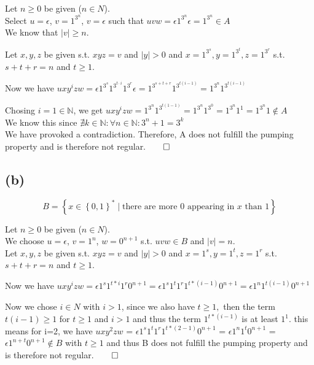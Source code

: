 Let $n \geq 0$ be given ($n \in N $).\\
Select $u = \epsilon$, $v=1^{3^{n}}$, $v=\epsilon$ such that $uvw = \epsilon 1^{3^{n}} \epsilon = 1^{3^{n}} \in A$\\
We know that $\lvert v \rvert \geq n$.

Let $x,y,z$ be given s.t. $xyz=v$ and $|y| > 0$ and $x=1^{3^{s}},y=1^{3^{t}},z=1^{3^{r}} $ s.t. $ s+t+r = n $ and $ t\geq 1$.

Now we have $uxy^izw = \epsilon 1^{3^{s}} 1^{3^{t\cdot i}} 1^{3^{r}} \epsilon = 1^{3^{s+t+r}} 1^{3^{t(i-1)}} = 1^{3^{n}}1^{3^{t(i-1)}}$

Chosing $i=1 \in \mathbb{N}$, we get $uxy^izw = 1^{3^{n}}1^{3^{t(1-1)}} = 1^{3^{n}}1^{3^{0}} = 1^{3^{n}}1^{1} = 1^{3^{n}}1 \notin A$\\
We know this since $\nexists k \in \mathbb{N}: \forall n \in \mathbb{N}: 3^{n} + 1 = 3^{k}$\\
We have provoked a contradiction. Therefore, A does not fulfill the pumping property and is therefore not regular.$\qed$

\subsection{(b)}

$$
B = \left\{ x \in \left\{0,1\right\}^{\ast} \mid \text{there are more }0\text{ appearing in }x\text{ than }1\right\}
$$

Let $n \geq 0$ be given ($n \in N $).\\
We choose $u = \epsilon$, $v= 1^n$, $w= 0^{n+1}$ s.t. $uvw \in B$ and $|v| = n$.\\
Let $x,y,z$ be given s.t. $xyz=v$ and $|y| > 0$ and $x=1^s,y=1^t,z=1^r $ s.t. $ s+t+r = n $ and $ t \geq 1$.

Now we have $uxy^izw = \epsilon 1^s 1^{t*i} 1^r 0^{n+1} = \epsilon 1^s 1^t 1^r 1^{t * (i-1)} 0^{n+1} = \epsilon 1^n 1^{t(i-1)}0^{n+1}$

Now we chose $i \in N$ with $i > 1$, since we also have $t \geq 1, $ then the term $t(i-1) \geq 1$ for $t \geq 1$ and $i > 1$ and thus the term $1^{t * (i-1)}$ is at least $1^1$. this means for i=2, we have  $uxy^2zw$ = $\epsilon 1^s 1^t 1^r 1^{t * (2-1)} 0^{n+1}$ = $\epsilon 1^n 1^{t}0^{n+1}$ = $\epsilon 1^{n + t}0^{n+1} \notin B$ with $t\geq1$ and thus B does not fulfill the pumping property and is therefore not regular.$\qed$


